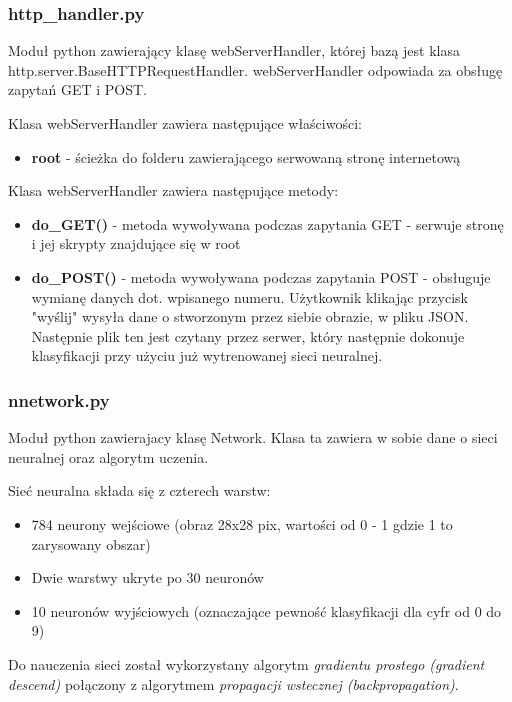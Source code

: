 \documentclass{article}
\begin{document}
\subsubsection{http\_handler.py}
Moduł python zawierający klasę webServerHandler, której bazą jest klasa http.server.BaseHTTPRequestHandler. webServerHandler odpowiada za obsługę zapytań GET i POST.

Klasa webServerHandler zawiera następujące właściwości:
\begin{itemize}
    \item \textbf{root} - ścieżka do folderu zawierającego serwowaną stronę internetową
\end{itemize}

Klasa webServerHandler zawiera następujące metody:
\begin{itemize}
    \item \textbf{do\_GET()} - metoda wywoływana podczas zapytania GET - serwuje stronę i jej skrypty znajdujące się w root
    \item \textbf{do\_POST()} - metoda wywoływana podczas zapytania POST - obsługuje wymianę danych dot. wpisanego numeru. Użytkownik klikając przycisk "wyślij" wysyła dane o stworzonym przez siebie
    obrazie, w pliku JSON. Następnie plik ten jest czytany przez serwer, który następnie dokonuje klasyfikacji przy użyciu już wytrenowanej sieci neuralnej.
\end{itemize}


\subsubsection{nnetwork.py}
Moduł python zawierajacy klasę Network. Klasa ta zawiera w sobie dane o sieci neuralnej oraz algorytm uczenia.

Sieć neuralna składa się z czterech warstw:
\begin{itemize}
    \item 784 neurony wejściowe (obraz 28x28 pix, wartości od 0 - 1 gdzie 1 to zarysowany obszar)
    \item Dwie warstwy ukryte po 30 neuronów
    \item 10 neuronów wyjściowych (oznaczające pewność klasyfikacji dla cyfr od 0 do 9)
\end{itemize}


Do nauczenia sieci został wykorzystany algorytm \textit{gradientu prostego (gradient descend)} połączony z algorytmem \textit{propagacji wstecznej (backpropagation)}.
\end{document}
